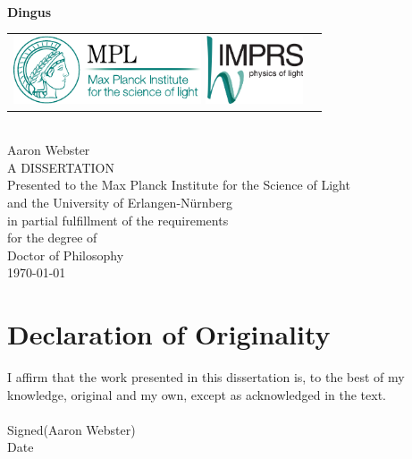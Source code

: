 \documentclass[a4paper,titlepage,onecolumn]{report}
\def\distitle{Dingus}
\begin{document}
\begin{titlepage}
\begin{center}
\hfill\\[4cm]
{ \Huge {\bfseries {\distitle}} \par}
\vspace{3.0cm}
\begin{tabular}{lr}
\includegraphics[height=2cm,keepaspectratio]{logo/Logo_MPL_englisch_kompakt_cmyk_110915}
\hspace{1.0cm}
%
\includegraphics[height=2cm,keepaspectratio]{logo/Logo_IMPRS_4c_042012}
\end{tabular}
\vspace{3cm}
\\
{\huge Aaron Webster}\\
\vspace{1cm}
{\large A DISSERTATION}\\
\vspace{0.5cm}
Presented to the Max Planck Institute for the Science of Light\\
and the University of Erlangen-N\"urnberg\\
in partial fulfillment of the requirements\\
for the degree of\\
Doctor of Philosophy\\
\vspace{0.5cm}
\today
\end{center}
\end{titlepage}

\chapter*{Declaration of Originality}
I affirm that the work presented in this dissertation is, to the best of my
knowledge, original and my own, except as acknowledged in the
text. \\
\hfill\\[1cm]
Signed\hspace{0.25cm}\makebox[5cm]{\hrulefill}\hspace{0.25cm}(Aaron Webster)
\hfill\\[1cm]
Date\hspace{0.51cm}\makebox[5cm]{\hrulefill}\hspace{0.25cm}
\vspace{2cm}
\end{document}
